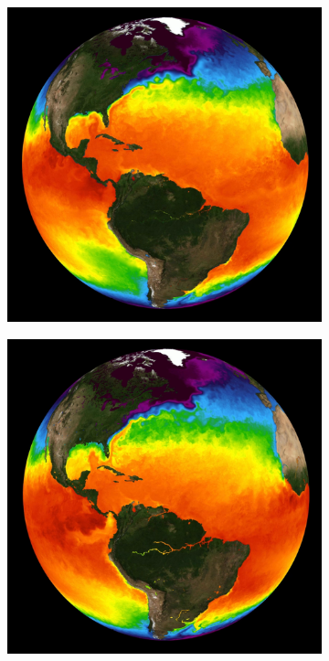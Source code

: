 \documentclass[journal]{vgtc}                %
\begin{document}
\begin{figure}
	\begin{subfigure}[tb]{0.32\linewidth}
    	\includegraphics[width=\textwidth]{earth_temporal/earth_temporal_sea_surface1.png}
	\end{subfigure}
    \begin{subfigure}[tb]{0.32\linewidth}
    	\includegraphics[width=\textwidth]{earth_temporal/earth_temporal_sea_surface2.png}

\end{subfigure}
\end{figure}
\end{document}
